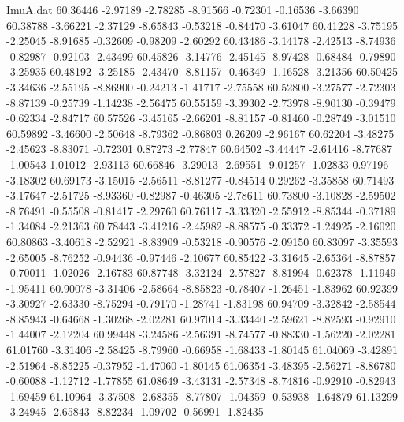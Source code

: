 \begin{filecontents}{ImuA.dat}
  60.36446   -2.97189   -2.78285   -8.91566   -0.72301   -0.16536   -3.66390
  60.38788   -3.66221   -2.37129   -8.65843   -0.53218   -0.84470   -3.61047
  60.41228   -3.75195   -2.25045   -8.91685   -0.32609   -0.98209   -2.60292
  60.43486   -3.14178   -2.42513   -8.74936   -0.82987   -0.92103   -2.43499
  60.45826   -3.14776   -2.45145   -8.97428   -0.68484   -0.79890   -3.25935
  60.48192   -3.25185   -2.43470   -8.81157   -0.46349   -1.16528   -3.21356
  60.50425   -3.34636   -2.55195   -8.86900   -0.24213   -1.41717   -2.75558
  60.52800   -3.27577   -2.72303   -8.87139   -0.25739   -1.14238   -2.56475
  60.55159   -3.39302   -2.73978   -8.90130   -0.39479   -0.62334   -2.84717
  60.57526   -3.45165   -2.66201   -8.81157   -0.81460   -0.28749   -3.01510
  60.59892   -3.46600   -2.50648   -8.79362   -0.86803    0.26209   -2.96167
  60.62204   -3.48275   -2.45623   -8.83071   -0.72301    0.87273   -2.77847
  60.64502   -3.44447   -2.61416   -8.77687   -1.00543    1.01012   -2.93113
  60.66846   -3.29013   -2.69551   -9.01257   -1.02833    0.97196   -3.18302
  60.69173   -3.15015   -2.56511   -8.81277   -0.84514    0.29262   -3.35858
  60.71493   -3.17647   -2.51725   -8.93360   -0.82987   -0.46305   -2.78611
  60.73800   -3.10828   -2.59502   -8.76491   -0.55508   -0.81417   -2.29760
  60.76117   -3.33320   -2.55912   -8.85344   -0.37189   -1.34084   -2.21363
  60.78443   -3.41216   -2.45982   -8.88575   -0.33372   -1.24925   -2.16020
  60.80863   -3.40618   -2.52921   -8.83909   -0.53218   -0.90576   -2.09150
  60.83097   -3.35593   -2.65005   -8.76252   -0.94436   -0.97446   -2.10677
  60.85422   -3.31645   -2.65364   -8.87857   -0.70011   -1.02026   -2.16783
  60.87748   -3.32124   -2.57827   -8.81994   -0.62378   -1.11949   -1.95411
  60.90078   -3.31406   -2.58664   -8.85823   -0.78407   -1.26451   -1.83962
  60.92399   -3.30927   -2.63330   -8.75294   -0.79170   -1.28741   -1.83198
  60.94709   -3.32842   -2.58544   -8.85943   -0.64668   -1.30268   -2.02281
  60.97014   -3.33440   -2.59621   -8.82593   -0.92910   -1.44007   -2.12204
  60.99448   -3.24586   -2.56391   -8.74577   -0.88330   -1.56220   -2.02281
  61.01760   -3.31406   -2.58425   -8.79960   -0.66958   -1.68433   -1.80145
  61.04069   -3.42891   -2.51964   -8.85225   -0.37952   -1.47060   -1.80145
  61.06354   -3.48395   -2.56271   -8.86780   -0.60088   -1.12712   -1.77855
  61.08649   -3.43131   -2.57348   -8.74816   -0.92910   -0.82943   -1.69459
  61.10964   -3.37508   -2.68355   -8.77807   -1.04359   -0.53938   -1.64879
  61.13299   -3.24945   -2.65843   -8.82234   -1.09702   -0.56991   -1.82435

\end{filecontents}

